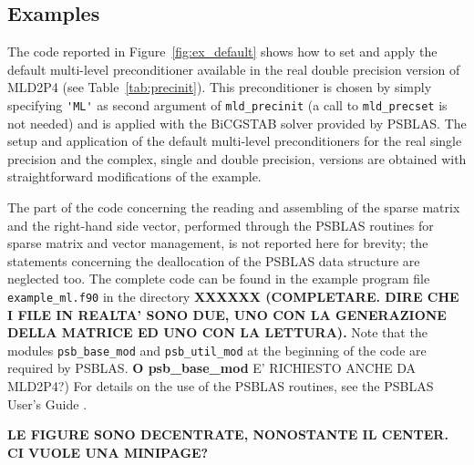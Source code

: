 \subsection{Examples\label{sec:examples}}

The code reported in Figure~\ref{fig:ex_default} shows how to set and apply the default
multi-level preconditioner available in the real double precision version
of MLD2P4 (see Table~\ref{tab:precinit}). This preconditioner is chosen
by simply specifying \verb|'ML'| as second argument of \verb|mld_precinit|
(a call to \verb|mld_precset| is not needed) and is applied with the BiCGSTAB
solver provided by PSBLAS. The setup and application of the default multi-level
preconditioners for the real single precision and the complex, single and double
precision, versions are obtained with straightforward modifications of the example.
 

The part of the code concerning the
reading and assembling of the sparse matrix and the right-hand side vector, performed
through the PSBLAS routines for sparse matrix and vector management, is not reported
here for brevity; the statements concerning the deallocation of the PSBLAS data structure
are neglected too.
The complete code can be found in the example program file \verb|example_ml.f90|
in the directory \textbf{XXXXXX (COMPLETARE. DIRE CHE I FILE IN REALTA' SONO DUE, UNO CON
LA GENERAZIONE DELLA MATRICE ED UNO CON LA LETTURA).} Note that the modules \verb|psb_base_mod|
and \verb|psb_util_mod| at the beginning of the code are required by PSBLAS.
\textbf{O psb\_base\_mod} E' RICHIESTO ANCHE DA MLD2P4?)
For details on the use of the PSBLAS routines, see the PSBLAS User's Guide \cite{}.

\textbf{LE FIGURE SONO DECENTRATE, NONOSTANTE IL CENTER. CI VUOLE UNA MINIPAGE?}


